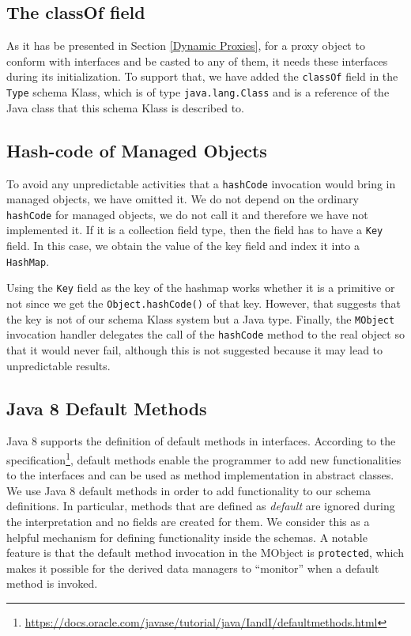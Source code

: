 \subsection{The classOf field}\label{The classOf field}
As it has be presented in Section \ref{Dynamic Proxies}, for a proxy object to conform with interfaces and be casted to any of them, it needs these interfaces during its initialization.
To support that, we have added the \texttt{classOf} field in the \texttt{Type} schema Klass, which is of type \texttt{java.lang.Class} and is a reference of the Java class that this schema Klass is described to.

\subsection{Hash-code of Managed Objects}\label{Hashcode of Managed Objects}
To avoid any unpredictable activities that a \texttt{hashCode} invocation would bring in managed objects, we have omitted it. 
We do not depend on the ordinary \texttt{hashCode} for managed objects, we do not call it and therefore we have not implemented it.
If it is a collection field type, then the field has to have a \texttt{Key} field. 
In this case, we obtain the value of the key field and index it into a \texttt{HashMap}. 

Using the \texttt{Key} field as the key of the hashmap works whether it is a primitive or not since we get the \texttt{Object.hashCode()} of that key.
However, that suggests that the key is not of our schema Klass system but a Java type.
Finally, the \texttt{MObject} invocation handler delegates the call of the \texttt{hashCode} method to the real object so that it would never fail, although this is not suggested because it may lead to unpredictable results.

\subsection{Java 8 Default Methods}\label{Java 8 Default Methods}
Java 8 supports the definition of default methods in interfaces.
According to the specification\footnote{\url{https://docs.oracle.com/javase/tutorial/java/IandI/defaultmethods.html}}, default methods enable the programmer to add new functionalities to the interfaces and can be used as method implementation in abstract classes.
We use Java 8 default methods in order to add functionality to our schema definitions. 
In particular, methods that are defined as \textit{default} are ignored during the interpretation and no fields are created for them.
We consider this as a helpful mechanism for defining functionality inside the schemas.
A notable feature is that the default method invocation in the MObject is \texttt{protected}, which makes it possible for the derived data managers to ``monitor'' when a default method is invoked.

